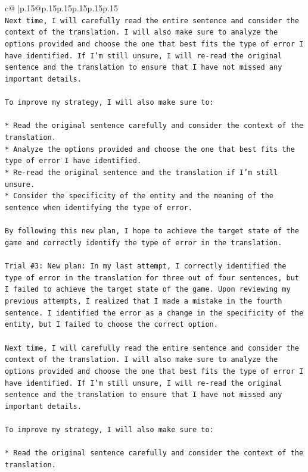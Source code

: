 \documentclass{article}
\begin{document}
{\begin{supertabular}{c@{$\;$}|p{.15\linewidth}@{}p{.15\linewidth}p{.15\linewidth}p{.15\linewidth}p{.15\linewidth}p{.15\linewidth}}
{{{\\ 
\texttt{Next time, I will carefully read the entire sentence and consider the context of the translation. I will also make sure to analyze the options provided and choose the one that best fits the type of error I have identified. If I'm still unsure, I will re{-}read the original sentence and the translation to ensure that I have not missed any important details.} \\
\\ 
\texttt{To improve my strategy, I will also make sure to:} \\
\\ 
\texttt{* Read the original sentence carefully and consider the context of the translation.} \\
\texttt{* Analyze the options provided and choose the one that best fits the type of error I have identified.} \\
\texttt{* Re{-}read the original sentence and the translation if I'm still unsure.} \\
\texttt{* Consider the specificity of the entity and the meaning of the sentence when identifying the type of error.} \\
\\ 
\texttt{By following this new plan, I hope to achieve the target state of the game and correctly identify the type of error in the translation.} \\
\\ 
\texttt{Trial \#3: New plan: In my last attempt, I correctly identified the type of error in the translation for three out of four sentences, but I failed to achieve the target state of the game. Upon reviewing my previous attempts, I realized that I made a mistake in the fourth sentence. I identified the error as a change in the specificity of the entity, but I failed to choose the correct option.} \\
\\ 
\texttt{Next time, I will carefully read the entire sentence and consider the context of the translation. I will also make sure to analyze the options provided and choose the one that best fits the type of error I have identified. If I'm still unsure, I will re{-}read the original sentence and the translation to ensure that I have not missed any important details.} \\
\\ 
\texttt{To improve my strategy, I will also make sure to:} \\
\\ 
\texttt{* Read the original sentence carefully and consider the context of the translation.} \\
}}}
\end{supertabular}}
\end{document}
